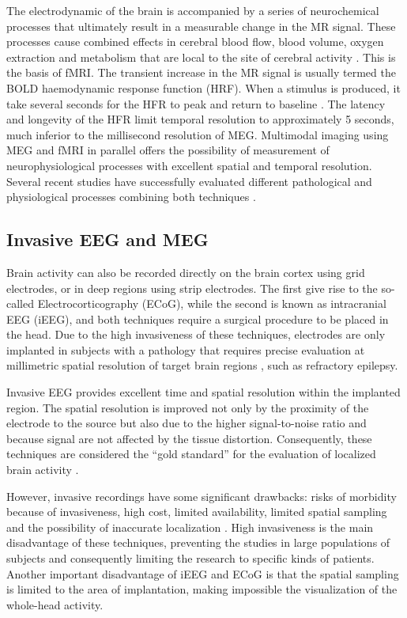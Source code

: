 The electrodynamic of the brain is accompanied by a series of neurochemical processes that ultimately result in a measurable change in the MR signal. These processes cause combined effects in cerebral blood flow, blood volume, oxygen extraction and metabolism that are local to the site of cerebral activity \citep{Belliveau1991}. This is the basis of fMRI. The transient increase in the MR signal is usually termed the BOLD haemodynamic response function (HRF). When a stimulus is produced, it take several seconds for the HFR to peak and return to baseline \citep{Hall2014}. The latency and longevity of the HFR limit temporal resolution to approximately 5 seconds, much inferior to the millisecond resolution of MEG. Multimodal imaging using MEG and fMRI in parallel offers the possibility of measurement of neurophysiological processes with excellent spatial and temporal resolution. Several recent studies have successfully evaluated different pathological and physiological processes combining both techniques \citep{McWhinney2016,Tewarie2016,Garces2016,Cetin2016}.  

          \subsection{Invasive EEG and MEG} %
Brain activity can also be recorded directly on the brain cortex using grid electrodes, or in deep regions using strip electrodes. The first give rise to the so-called Electrocorticography (ECoG), while the second is known as intracranial EEG (iEEG), and both techniques require a surgical procedure to be placed in the head. Due to the high invasiveness of these techniques, electrodes are only implanted in subjects with a pathology that requires precise evaluation at millimetric spatial resolution of target brain regions \citep{Grova2016}, such as refractory epilepsy.

Invasive EEG provides excellent time and spatial resolution within the implanted region. The spatial resolution is improved not only by the proximity of the electrode to the source but also due to the higher signal-to-noise ratio and because signal are not affected by the tissue distortion. Consequently, these techniques are considered the ``gold standard'' for the evaluation of localized brain activity \citep{Santiuste2008}.

However, invasive recordings have some significant drawbacks: risks of morbidity because of invasiveness, high cost, limited availability, limited spatial sampling and the possibility of inaccurate localization \citep{Santiuste2008}. High invasiveness is the main disadvantage of these techniques, preventing the studies in large populations of subjects  and consequently limiting the research to specific kinds of patients. Another important disadvantage of iEEG and ECoG is that the spatial sampling is limited to the area of implantation, making impossible the visualization of the whole-head activity. 

